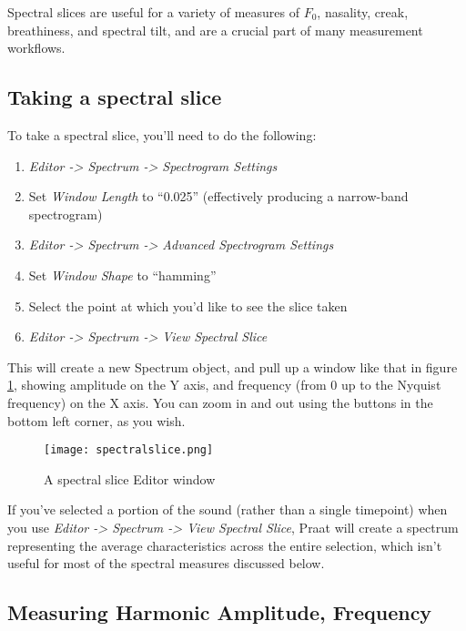 \documentclass[11pt]{article}
\def\tightlist{}
\begin{document}
Spectral slices are useful for a variety of measures of \(F_0\),
nasality, creak, breathiness, and spectral tilt, and are a crucial part
of many measurement workflows.

\hypertarget{taking-a-spectral-slice}{%
\subsection{Taking a spectral slice}\label{taking-a-spectral-slice}}

\label{sub:gettingaslice} To take a spectral slice, you'll need to do
the following:

\begin{enumerate}
\def\labelenumi{\arabic{enumi}.}
\tightlist
\item
  \emph{Editor -\textgreater{} Spectrum -\textgreater{} Spectrogram
  Settings}
\item
  Set \emph{Window Length} to ``0.025'' (effectively producing a
  narrow-band spectrogram)
\item
  \emph{Editor -\textgreater{} Spectrum -\textgreater{} Advanced
  Spectrogram Settings}
\item
  Set \emph{Window Shape} to ``hamming''
\item
  Select the point at which you'd like to see the slice taken
\item
  \emph{Editor -\textgreater{} Spectrum -\textgreater{} View Spectral
  Slice}
\end{enumerate}

This will create a new Spectrum object, and pull up a window like that
in figure \ref{spectralslice}, showing amplitude on the Y axis, and
frequency (from 0 up to the Nyquist frequency) on the X axis. You can
zoom in and out using the buttons in the bottom left corner, as you
wish.

\begin{figure}
  \centerline{
    \mbox{\texttt{[image: spectralslice.png]}}
  }
  \caption{A spectral slice Editor window \label{spectralslice}}

  \end{figure}

If you've selected a portion of the sound (rather than a single
timepoint) when you use \emph{Editor -\textgreater{} Spectrum
-\textgreater{} View Spectral Slice}, Praat will create a spectrum
representing the average characteristics across the entire selection,
which isn't useful for most of the spectral measures discussed below.

\hypertarget{measuring-harmonic-amplitude-frequency}{%
\subsection{Measuring Harmonic Amplitude,
Frequency}\label{measuring-harmonic-amplitude-frequency}}
\end{document}
